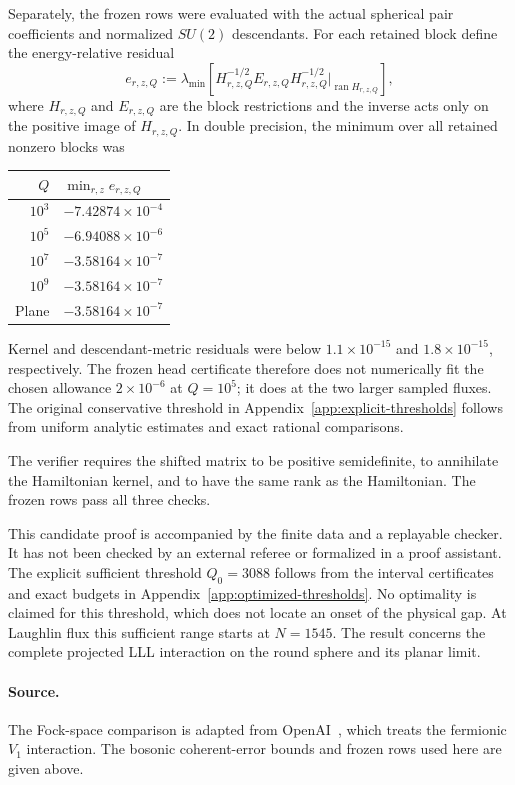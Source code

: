 \documentclass[11pt]{article}
\newcommand{\ran}{\operatorname{ran}}
\begin{document}
Separately, the frozen rows were evaluated with the actual spherical pair
coefficients and normalized $SU(2)$ descendants. For each retained block
define the energy-relative residual
\begin{equation}
 e_{r,z,Q}:=\lambda_{\min}\!\left[
 H_{r,z,Q}^{-1/2}E_{r,z,Q}H_{r,z,Q}^{-1/2}
 \big|_{\ran H_{r,z,Q}}\right],
\end{equation}
where $H_{r,z,Q}$ and $E_{r,z,Q}$ are the block restrictions and the inverse
acts only on the positive image of $H_{r,z,Q}$. In double precision,
the minimum over all retained nonzero blocks was
\begin{center}
\begin{tabular}{rl}
\toprule
$Q$ & $\min_{r,z}e_{r,z,Q}$\\
\midrule
$10^3$ & $-7.42874\times10^{-4}$\\
$10^5$ & $-6.94088\times10^{-6}$\\
$10^7$ & $-3.58164\times10^{-7}$\\
$10^9$ & $-3.58164\times10^{-7}$\\
Plane & $-3.58164\times10^{-7}$\\
\bottomrule
\end{tabular}
\end{center}
Kernel and descendant-metric residuals were below $1.1\times10^{-15}$ and
$1.8\times10^{-15}$, respectively. The frozen head certificate therefore
does not numerically fit the chosen allowance $2\times10^{-6}$ at $Q=10^5$;
it does at the two larger sampled fluxes. The original conservative
threshold in Appendix~\ref{app:explicit-thresholds} follows from uniform
analytic estimates and exact rational comparisons.

The verifier requires the shifted matrix to be positive semidefinite,
to annihilate the Hamiltonian kernel, and to have the same rank as the
Hamiltonian. The frozen rows pass all three checks.

This candidate proof is accompanied by the finite data and a replayable
checker. It has not been checked by an external referee or
formalized in a proof assistant. The explicit sufficient threshold
$Q_0=3088$ follows from the interval certificates and exact budgets in
Appendix~\ref{app:optimized-thresholds}. No optimality is claimed for this
threshold, which does not locate an onset of the physical gap. At Laughlin flux this sufficient
range starts at $N=1545$. The result concerns the complete projected LLL
interaction on the round sphere and its planar limit.

\paragraph{Source.}
The Fock-space comparison is adapted from OpenAI~\cite{OpenAI2026},
which treats the fermionic $V_1$ interaction. The bosonic coherent-error
bounds and frozen rows used here are given above.
\end{document}
